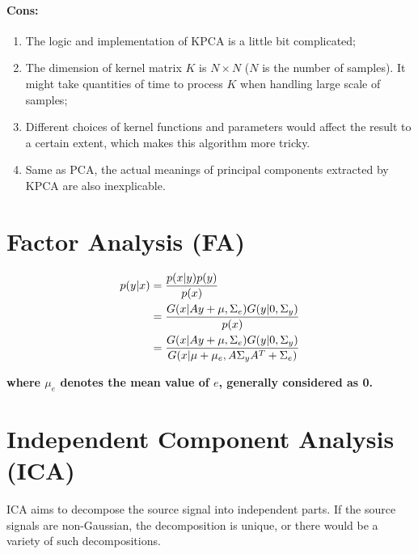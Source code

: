 \documentclass[12pt,a4paper]{article}
\theoremstyle{definition}
\begin{document}
\vspace{-0.03\linewidth}
\paragraph{Cons:}
\begin{enumerate}
	\item The logic and implementation of KPCA is a little bit complicated;
	
	\item The dimension of kernel matrix $K$ is $N \times N$ ($N$ is the number of samples). It might take quantities of time to process $K$ when handling large scale of samples;
	
	\item Different choices of kernel functions and parameters would affect the result to a certain extent, which makes this algorithm more tricky.
	
	\item Same as PCA, the actual meanings of principal components extracted by KPCA are also inexplicable.
\end{enumerate}

\section{Factor Analysis (FA)}

\vspace{-0.03\linewidth}
\begin{large}
\begin{align*}
	\centering	
	p(y|x) &= \dfrac{p(x|y)p(y)}{p(x)} \\
	&= \dfrac{G(x|Ay+\mu,\Sigma_{e})G(y|0,\Sigma_{y})}{p(x)} \\
	&= \dfrac{G(x|Ay+\mu,\Sigma_{e})G(y|0,\Sigma_{y})}{G(x|\mu+\mu_{e},A\Sigma_{y}A^{T}+\Sigma_{e})}
\end{align*}
\end{large}

\textbf{where $\mu_{e}$ denotes the mean value of $e$, generally considered as 0.}

\section{Independent Component Analysis (ICA)}

ICA aims to decompose the source signal into independent parts. If the source signals are non-Gaussian, the decomposition is unique, or there would be a variety of such decompositions.
\end{document}

